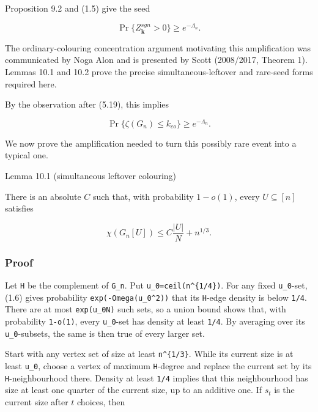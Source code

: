 \documentclass[
  11pt,
  a4paper,
]{article}
\begin{document}
Proposition 9.2 and (1.5) give the seed

\[
 \Pr\{Z_{\mathbf k}^{sgn}>0\}\ge e^{-\Lambda_n}.        \tag{10.1}
\]

The ordinary-colouring concentration argument motivating this
amplification was communicated by Noga Alon and is presented by Scott
(2008/2017, Theorem 1). Lemmas 10.1 and 10.2 prove the precise
simultaneous-leftover and rare-seed forms required here.

By the observation after (5.19), this implies

\[
 \Pr\{\zeta(G_n)\le k_{co}\}\ge e^{-\Lambda_n}.        \tag{10.2}
\]

We now prove the amplification needed to turn this possibly rare event
into a typical one.

{}
\label{lemma-10.1-simultaneous-leftover-colouring}
\begin{lemmabox}{Lemma 10.1 (simultaneous leftover colouring)}

There is an absolute \(C\) such that, with probability \(1-o(1)\), every
\(U\subseteq[n]\) satisfies

\[
 \chi(G_n[U])\le C\frac{|U|}{N}+n^{1/3}.                 \tag{10.3}
\]

\end{lemmabox}

\subsubsection{Proof}\label{proof-9}

Let \texttt{H} be the complement of \texttt{G\_n}. Put
\texttt{u\_0=ceil(n\^{}\{1/4\})}. For any fixed \texttt{u\_0}-set, (1.6)
gives probability
\texttt{exp(-Omega(u\_}\allowbreak{}\texttt{0\^{}2)}\allowbreak{}\texttt{)}
that its \texttt{H}-edge density is below \texttt{1/4}. There are at
most \texttt{exp(u\_0N)} such sets, so a union bound shows that, with
probability \texttt{1-o(1)}, every \texttt{u\_0}-set has density at
least \texttt{1/4}. By averaging over its \texttt{u\_0}-subsets, the
same is then true of every larger set.

Start with any vertex set of size at least \texttt{n\^{}\{1/3\}}. While
its current size is at least \texttt{u\_0}, choose a vertex of maximum
\texttt{H}-degree and replace the current set by its
\texttt{H}-neighbourhood there. Density at least \texttt{1/4} implies
that this neighbourhood has size at least one quarter of the current
size, up to an additive one. If \(s_t\) is the current size after \(t\)
choices, then
\end{document}
